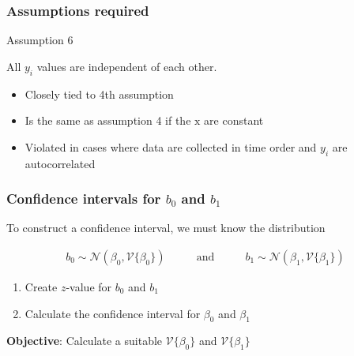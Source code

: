 \begin{frame}\frametitle{Assumptions required}
	\begin{block}{Assumption 6}
		\begin{center}
			All $y_i$ values are independent of each other.
		\end{center}
	\end{block}
	\begin{itemize}
		\item	Closely tied to 4th assumption
		\item	Is the same as assumption 4 if the $\mathrm{x}$ are constant
		\item	Violated in cases where data are collected in time order and $y_i$ are autocorrelated
	\end{itemize}
\end{frame}

\begin{frame}\frametitle{Confidence intervals for $b_0$ and $b_1$}

	To construct a confidence interval, we must know the distribution

	$$
	\begin{array}{lcr}
		b_0 \sim \mathcal{N}(\beta_0, \mathcal{V}\{\beta_0\}) &\qquad\text{and}\qquad& b_1 \sim \mathcal{N}(\beta_1,\mathcal{V}\{\beta_1\})
	\end{array}
	$$
	\begin{enumerate}
		\item	Create $z$-value for $b_0$ and $b_1$
		\item	Calculate the confidence interval for $\beta_0$ and $\beta_1$
	\end{enumerate}

	\vspace{12pt}
	\textbf{Objective}: Calculate a suitable $\mathcal{V}\{\beta_0\}$ and $\mathcal{V}\{\beta_1\}$
\end{frame}

